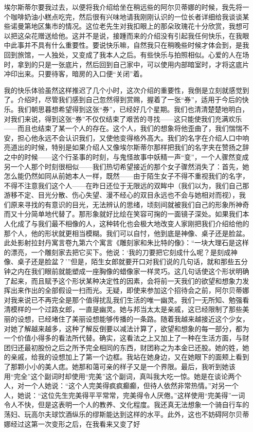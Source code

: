 \par 埃尔斯蒂尔要我过去，以便将我介绍给坐在稍远些的阿尔贝蒂娜的时候，我先将一个咖啡奶油小糕点吃完，然后很有兴味地请我刚刚认识的一位长者详细给我谈谈某些诺曼第地区集市的情况。这位老先生对我扣眼上的那朵玫瑰花十分欣赏，我想可以把这朵花赠送给他。这并不是说，接踵而来的介绍没有引起我任何快乐，在我眼中此事并不具有什么重要性。要说快乐嘛，自然我只在稍晚些时候才体会到，是我回到旅馆，一人独处，又变成了我本人之后。有些快乐与拍照相似。心爱的人在场时，拿到的只是一张底片，然后回到自己家中，可以使用内部暗室时，才将这底片冲印出来。只要待客，暗房的入口便“关闭”着。
\par 我的快乐体验虽然这样推迟了几个小时，这次介绍的重要性，我倒是立刻就感觉到了。介绍时，尽管我们感到自己忽然得到赏赐，握着了一张“券”，适用于今后的快乐。我们朝思暮想希望得到这张“券”，已经好几个星期。我们也清清楚楚地明白，对我们来说，得到这张“券”不仅仅结束了艰苦的寻找——这只能使我们充满欢乐——而且也结束了某一个人的存在。这个人，我们的想象将他歪曲了，我们惴惴不安，担心他永远不会认识我们，又使他变得格外高大。我们的名字在介绍人口中响亮道出的时候，特别是如果介绍人又像埃尔斯蒂尔那样把我们的名字夹在赞扬之辞之中的时候——这个行圣事的时刻，与鬼怪故事中妖精一声“变”，一个人骤然变成另一个人那个时刻很相似——我们热切希望接近的那个女子骤然消失了：首先，她怎么能仍然如同从前她本人一样，既然——由于陌生女子不得不重视我们的名字，不得不注意我们这个人——在昨日还位于无限远的双眸中（我们以为，我们自己那游移不定、目光分散、伤心失望、漫不经心的双目永远也不会与她相对而视），我们原来寻找的有意识的目光，无法辨认的思绪，顷刻间就被我们自己的形象所神奇而又十分简单地代替了。那形象就好比绘在笑容可掬的一面镜子深处。如果我们本人化成了与我们最不相像的人，这种转化也会极大地改变人家刚把我们介绍给他的那个人，他的形状就更相当模糊。我们可以自忖，他到底是神像、桌子还是脸盆。此处影射拉封丹寓言卷九第六个寓言《雕刻家和朱比特的像》：“一块大理石是这样的漂亮，一个雕刻家去把它买下。他说：‘我的刀要把它刻成什么呢？是刻成神像、桌子还是脸盆？’”但是，陌生女郎就要开口对我们说的几句话，就和那些五分钟之内在我们眼前就能塑成一座胸像的蜡像家一样灵巧。这几句话使这个形状明确了起来，而且赋予这个形状某种决定性的因素，会将前一天我们的欲望和想象力发挥出来作出的全部假设一扫而光。无疑，即使来参加这个招待会之前，阿尔贝蒂娜对我来说已不再完全是那个值得扰乱我们生活的唯一幽灵。我们一无所知、勉强看清模样的一个过路女郎，一直是幽灵。她与邦当太太是亲戚，这已经限制了那些美丽的设想，已经堵住了美丽设想能够传播的一条路。随着我越来越接近这个少女，对她了解越来越多，这种了解反倒要以减法计算了，欲望和想象的每一部分，都为一个价值小得多的看法所代替。确实，这看法之上又加上了一种在生活方面，与财团归还最初股份之后之所予完全相同的东西，财团称之为本金已还股。她的姓，她的亲戚，给我的设想加上了第一个边框。我站在她身边，又在她眼下的面颊上看到了那颗小小的美人痣。她那和蔼可亲的样子又是一个界限。最后，我听到她该用“完全”这个副词时却使用“完美”这个副词，真叫我大吃一惊。她是在谈论两个人，对一个人她说：“这个人完美得疯疯癫癫，但待人依然非常热情。”对另一个人，她说：“这位先生完美得平平常常，完美得令人厌倦。”这样使用“完美得”一词令人不快，但是这表明一个人的教养、文化程度。我还真无法想象一个骑自行车的荡妇、玩高尔夫球饮酒纵乐的缪斯能达到这样的水平。此外，这也不妨碍阿尔贝蒂娜经过这第一次变形之后，在我看来又变了好